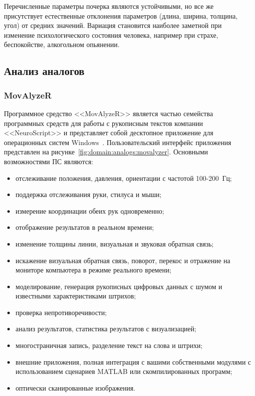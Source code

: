 Перечисленные параметры почерка являются устойчивыми, но все же присутствует естественные отклонения параметров (длина, ширина, толщина, угол) от средних значений. Вариация становится наиболее заметной при изменение психологического состояния человека, например при страхе, беспокойстве, алкогольном опьянении.

\subsection{Анализ аналогов}
\label{sub:domain:analogs}

\subsubsection{MovAlyzeR}
\label{sub:domain:analogs:movalyzer}
Программное средство <<MovAlyzeR>> является частью семейства программных средств для работы с рукописным текстов компании <<NeuroScript>> и представляет собой десктопное приложение для операционных систем Windows~\cite{analogs_movalyzer}. Пользовательский интерфейс приложения представлен на рисунке~\ref{fig:domain:analogs:movalyzer}.
Основными возможностями ПС являются:
\begin{itemize}
  \item отслеживание положения, давления, ориентации с частотой \mbox{100-200 Гц;}
  \item поддержка отслеживания руки, стилуса и мыши;
  \item измерение координации обеих рук одновременно;
  \item отображение результатов в реальном времени;
  \item изменение толщины линии, визуальная и звуковая обратная связь;
  \item искажение визуальная обратная связь, поворот, перекос и отражение на мониторе компьютера в режиме реального времени;
  \item моделирование, генерация рукописных цифровых данных с шумом и известными характеристиками штрихов;
  \item проверка непротиворечивости;
  \item анализ результатов, статистика результатов с визуализацией;
  \item многостраничная запись, разделение текст на слова и штрихи;
  \item внешние приложения, полная интеграция с вашими собственными модулями с использованием сценариев MATLAB или скомпилированных программ;
  \item оптически сканированные изображения.
\end{itemize}

